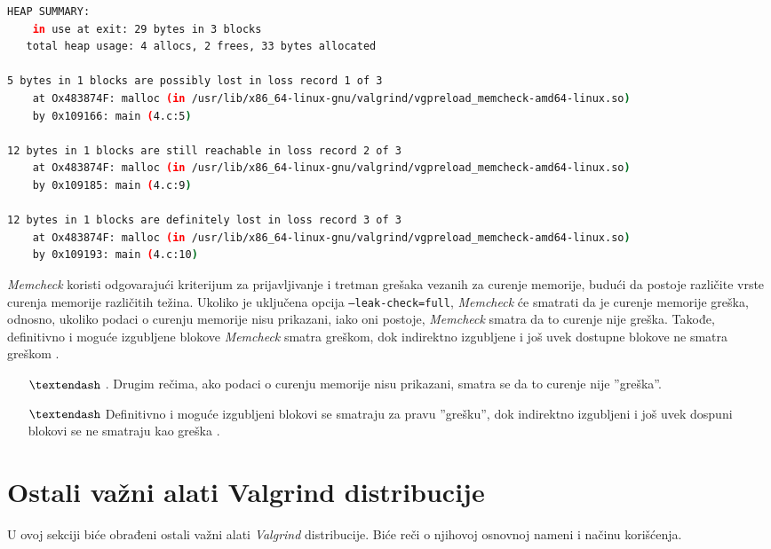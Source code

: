 \documentclass[12pt,oneside]{memoir}
\theoremstyle{plain}
\theoremstyle{definition}
\begin{document}
\begin{lstlisting}[style=terminal,caption={Izveštaj o curenju memorije}, label={lst:slika2.14},language={bash}] 
HEAP SUMMARY:
    in use at exit: 29 bytes in 3 blocks
   total heap usage: 4 allocs, 2 frees, 33 bytes allocated
   
5 bytes in 1 blocks are possibly lost in loss record 1 of 3
    at Ox483874F: malloc (in /usr/lib/x86_64-linux-gnu/valgrind/vgpreload_memcheck-amd64-linux.so)
    by 0x109166: main (4.c:5)

12 bytes in 1 blocks are still reachable in loss record 2 of 3
    at Ox483874F: malloc (in /usr/lib/x86_64-linux-gnu/valgrind/vgpreload_memcheck-amd64-linux.so)
    by 0x109185: main (4.c:9)

12 bytes in 1 blocks are definitely lost in loss record 3 of 3
    at Ox483874F: malloc (in /usr/lib/x86_64-linux-gnu/valgrind/vgpreload_memcheck-amd64-linux.so)
    by 0x109193: main (4.c:10)
\end{lstlisting}

\textit{Memcheck} koristi odgovarajući kriterijum za prijavljivanje i tretman grešaka vezanih za curenje memorije, budući da postoje različite vrste curenja memorije različitih težina. Ukoliko je uključena opcija \texttt{--leak-check=full}, \textit{Memcheck} će smatrati da je curenje memorije greška, odnosno, ukoliko podaci o curenju memorije nisu prikazani, iako oni postoje, \textit{Memcheck} smatra da to curenje nije greška. Takođe, definitivno i moguće izgubljene blokove \textit{Memcheck} smatra greškom, dok indirektno izgubljene i još uvek dostupne blokove ne smatra greškom \cite{Memcheck}.

\begin{itemize}
\item[$\textendash$]. Drugim rečima, ako podaci o curenju memorije nisu prikazani, smatra se da to curenje nije ''greška''.
\item[$\textendash$] Definitivno i moguće izgubljeni blokovi se smatraju za pravu ''grešku'', dok indirektno izgubljeni i još uvek dospuni blokovi se ne smatraju kao greška \cite{Memcheck}. 
\end{itemize}

\section{Ostali važni alati Valgrind distribucije}

U ovoj sekciji biće obrađeni ostali važni alati \textit{Valgrind} distribucije. Biće reči o njihovoj osnovnoj nameni i načinu korišćenja. 
\end{document}
